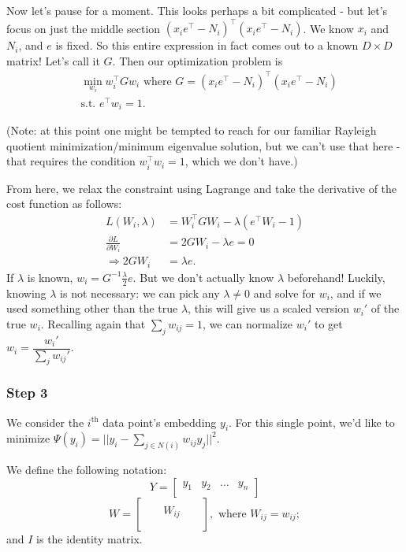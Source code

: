 Now let's pause for a moment. This looks perhaps a bit complicated - but let's focus on just the middle section $(x_i e^\intercal-N_i)^\intercal (x_i e^\intercal - N_i)$. We know $x_i$ and $N_i$, and $e$ is fixed. So this entire expression in fact comes out to a known $D \times D$ matrix! Let's call it $G$. Then our optimization problem is
\begin{align*}
&\min_{w_i} w_i^\intercal G w_i \text{ where } G = (x_i e^\intercal-N_i)^\intercal (x_i e^\intercal - N_i)\\
&\text{s.t. } e^\intercal w_i = 1.
\end{align*}

(Note: at this point one might be tempted to reach for our familiar Rayleigh quotient minimization/minimum eigenvalue solution, but we can't use that here - that requires the condition $w_{i}^\intercal w_i = 1$, which we don't have.)

From here, we relax the constraint using Lagrange and take the derivative of the cost function as follows:
\begin{align*}
L(W_i,\lambda) &= W_i^\intercal G W_i - \lambda (e^\intercal W_i - 1)\\
\frac{\partial L}{\partial W_i} &= 2GW_i - \lambda e = 0\\
\Rightarrow 2GW_i &= \lambda e.
\end{align*}
If $\lambda$ is known, $w_i=G^{-1} \frac{\lambda}{2} e$. But we don't actually know $\lambda$ beforehand! Luckily, knowing $\lambda$ is not necessary: we can pick any $\lambda \neq 0$ and solve for $w_i$, and if we used something other than the true $\lambda$, this will give us a scaled version $w_{i}'$ of the true $w_i$. Recalling again that $\sum_j w_{ij} = 1$, we can normalize $w_{i}'$ to get $w_i = \dfrac{w_{i}'}{\sum_j w_{ij}'}$.

\subsubsection*{Step 3}
We consider the $i^\text{th}$ data point's embedding $y_i$. For this single point, we'd like to minimize $\Psi (y_i)=||y_i-\sum_{j\in N(i)} w_{ij} y_j||^2$.

We define the following notation:
\[Y=
\begin{bmatrix}
    y_1 & y_2 & \dots & y_n \\
\end{bmatrix}
\]
\[
W=
\begin{bmatrix}
    && && \\
    && W_{ij} && \\
    && && \\
\end{bmatrix}, \text{ where } W_{ij} = w_{ij};
\]
and $I$ is the identity matrix.

